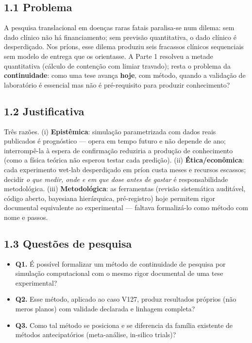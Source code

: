 \documentclass[
  12pt,
]{report}
\providecommand{\tightlist}{%
  \setlength{\itemsep}{0pt}\setlength{\parskip}{0pt}}
\begin{document}
\hypertarget{problema}{%
\subsection{1.1 Problema}\label{problema}}

A pesquisa translacional em doenças raras fatais paralisa-se num dilema:
sem dado clínico não há financiamento; sem previsão quantitativa, o dado
clínico é desperdiçado. Nos príons, esse dilema produziu seis fracassos
clínicos sequenciais sem modelo de entrega que os orientasse. A Parte 1
resolveu a metade quantitativa (cálculo de contenção com limiar
travado); resta o problema da \textbf{continuidade}: como uma tese
avança \textbf{hoje}, com método, quando a validação de laboratório é
essencial mas não é pré-requisito para produzir conhecimento?

\hypertarget{justificativa}{%
\subsection{1.2 Justificativa}\label{justificativa}}

Três razões. (i) \textbf{Epistêmica}: simulação parametrizada com dados
reais publicados é prognóstico --- opera em tempo futuro e não depende
de ano; interrompê-la à espera de confirmação reduziria a produção de
conhecimento (como a física teórica não esperou testar cada predição).
(ii) \textbf{Ética/econômica}: cada experimento wet-lab desperdiçado em
príon custa meses e recursos escassos; decidir \emph{o que medir, onde e
em que dose antes de gastar} é responsabilidade metodológica. (iii)
\textbf{Metodológica}: as ferramentas (revisão sistemática auditável,
código aberto, bayesiana hierárquica, pré-registro) hoje permitem rigor
documental equivalente ao experimental --- faltava formalizá-lo como
método com nome e passos.

\hypertarget{questuxf5es-de-pesquisa}{%
\subsection{1.3 Questões de pesquisa}\label{questuxf5es-de-pesquisa}}

\begin{itemize}
\tightlist
\item
  \textbf{Q1.} É possível formalizar um método de continuidade de
  pesquisa por simulação computacional com o mesmo rigor documental de
  uma tese experimental?
\item
  \textbf{Q2.} Esse método, aplicado ao caso V127, produz resultados
  próprios (não meros planos) com validade declarada e linhagem
  completa?
\item
  \textbf{Q3.} Como tal método se posiciona e se diferencia da família
  existente de métodos antecipatórios (meta-análise, in-silico trials)?
\end{itemize}
\end{document}
